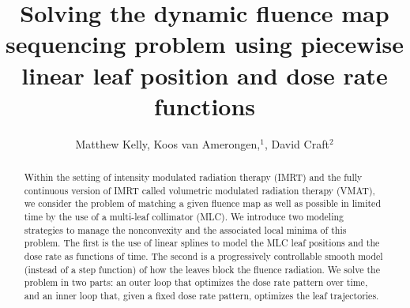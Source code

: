 \documentclass{iopart}
\begin{document}
\title[Dynamic MLC sequencing with splines ]{Solving the dynamic fluence map sequencing problem using piecewise linear leaf position and dose rate functions}
\author{Matthew Kelly, Koos van Amerongen,$^1$, David Craft$^2$}
\address{$^1$ Department of Econometrics and Operations Research/Center for Economic Research (CentER), Tilburg University, PO Box 90153, 5
000 LE Tilburg, The Netherlands}
\address{$^2$ Department of Radiation Oncology, Massachusetts General Hospital and Harvard Medical School, Boston, MA 02114, USA}

\begin{abstract}
  Within the setting of intensity modulated radiation therapy (IMRT) and the fully continuous version of IMRT called volumetric modulated radiation therapy (VMAT), we consider the problem of matching a given fluence map as well as possible in limited time by the use of a multi-leaf collimator (MLC). We introduce two modeling strategies to manage the nonconvexity and the associated local minima of this problem. The first is the use of linear splines to model the MLC leaf positions and the dose rate as functions of time. The second is a progressively controllable smooth model (instead of a step function) of how the leaves block the fluence radiation. We solve the problem in two parts: an outer loop that optimizes the dose rate pattern over time, and an inner loop that, given a fixed dose rate pattern, optimizes the leaf trajectories.
\end{abstract}
\end{document}
